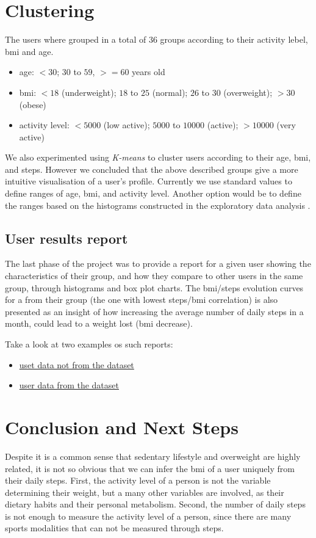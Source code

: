 \documentclass[11pt]{iopart}
\begin{document}
\section{Clustering}
The users where grouped in a total of 36 groups according to their activity lebel, bmi and age.
\begin{itemize}\smaller
\item age: $< 30$; $30$ to  $59$, $>=60$ years old
\item bmi: $<18$ (underweight); $18$ to $25$ (normal); $26$ to $30$ (overweight); $>30$ (obese)
\item activity level: $<5000$ (low active);  $5000$ to $10000$ (active); $>10000$ (very active)
\end{itemize}
We also experimented using \textit{K-means} to cluster users according to their age, bmi, and steps. However we concluded that the above described groups 
give a more intuitive visualisation of a user's profile. 
Currently we use standard values to define ranges of age, bmi, and activity level.  Another option would be to define the ranges based on the histograms constructed in the exploratory data analysis .





\subsection{User results report}
The last phase of the project was to provide a report for a given user showing the characteristics of their group, and how they compare to other users in the same group, through histograms and box plot charts. The bmi/steps evolution curves for a from their group (the one with lowest steps/bmi correlation) is also presented as an insight of how increasing the average number of daily steps in a month, could lead to a weight lost (bmi decrease).

Take a look at two examples os such reports: 
\begin{itemize}
\item \href{https://github.com/renatalucia/activity-tracker/blob/master/clustering/report_1.pdf}{uset data not from the dataset}
\item \href{https://github.com/renatalucia/activity-tracker/blob/master/clustering/report_2.pdf}{user data from the dataset}
\end{itemize}


\section{Conclusion and Next Steps}
Despite it is a common sense that sedentary lifestyle and overweight are highly related, it is not so obvious that we can infer the bmi of a user uniquely from their daily steps.
First, the activity level of a person is not the variable determining their weight, but a many other variables are involved, as their dietary habits and their personal metabolism.
Second, the number of daily steps is not enough to measure the activity level of a person, since there are many sports modalities that can not be measured through steps.
\end{document}
